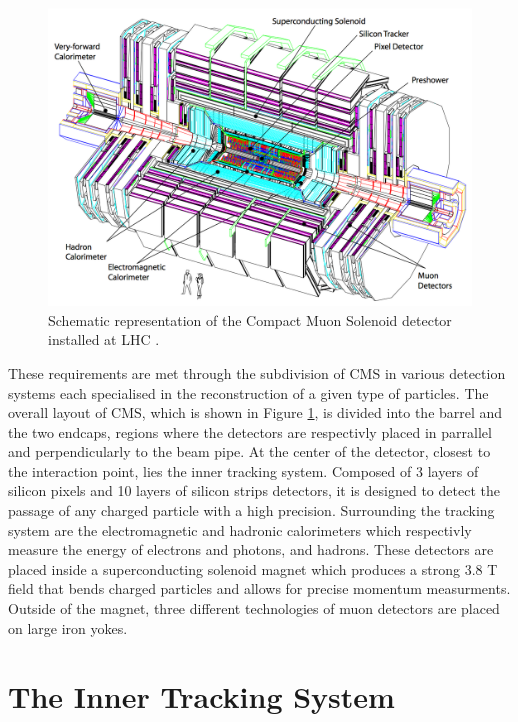     \begin{figure}[h!]
      \centering
      \includegraphics[width=\textwidth]{img/I-3-cms/cms.png}
      \caption{Schematic representation of the Compact Muon Solenoid detector installed at LHC \cite{1748-0221-3-08-S08004}.}
      \label{fig:I-3-cms-global-view}
    \end{figure}

    These requirements are met through the subdivision of CMS in various detection systems each specialised in the reconstruction of a given type of particles. The overall layout of CMS, which is shown in Figure \ref{fig:I-3-cms-global-view}, is divided into the barrel and the two endcaps, regions where the detectors are respectivly placed in parrallel and perpendicularly to the beam pipe. At the center of the detector, closest to the interaction point, lies the inner tracking system. Composed of 3 layers of silicon pixels and 10 layers of silicon strips detectors, it is designed to detect the passage of any charged particle with a high precision. Surrounding the tracking system are the electromagnetic and hadronic calorimeters which respectivly measure the energy of electrons and photons, and hadrons. These detectors are placed inside a superconducting solenoid magnet which produces a strong 3.8 T field that bends charged particles and allows for precise momentum measurments. Outside of the magnet, three different technologies of muon detectors are placed on large iron yokes.


  \section{The Inner Tracking System}

